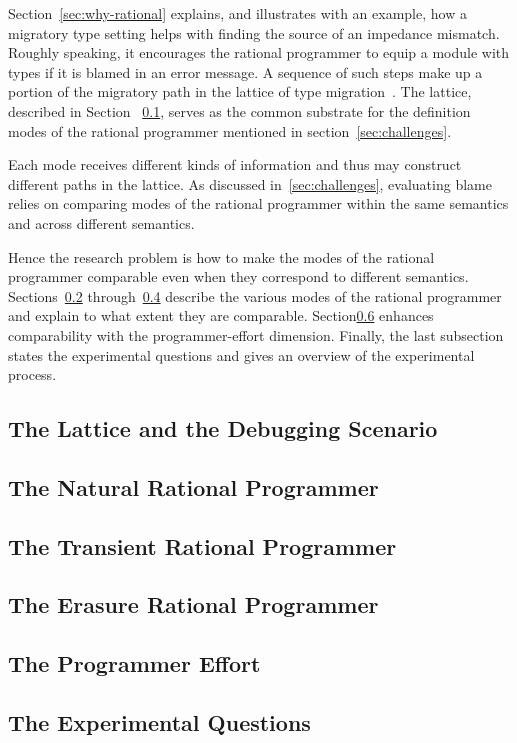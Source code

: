 
Section~\ref{sec:why-rational} explains, and illustrates with an example,
how a migratory type setting helps with finding the source of an impedance
mismatch. Roughly speaking, it encourages the rational programmer to
equip a module with types if it is blamed in an error message. A sequence
of such steps make up a portion of the migratory path in the lattice of
type migration~\cite{tfgnvf-popl-2016}. The lattice, described in Section
~\ref{sub:stuff},  serves as the common substrate for the definition modes
of the rational programmer mentioned in section~\ref{sec:challenges}. 

Each mode receives different kinds of information and thus may construct
different paths in the lattice. As discussed in~\ref{sec:challenges},
evaluating blame relies on comparing modes of the rational programmer
within the same semantics and across different semantics.  

Hence the research problem is how to make the modes of the rational programmer
comparable even when they correspond to different semantics. Sections~\ref{sub:natural}
through~\ref{sub:erasure} describe the various modes of the rational programmer and explain
to what extent they are comparable. Section\ref{sub:experiment}
enhances comparability with the programmer-effort dimension. Finally, the last
subsection states the experimental questions and gives an overview of the
experimental process. 

\def\rsub#1#2{\subsection{#2} \label{sub:#1} }

\rsub{stuff}     {The Lattice and the Debugging Scenario} 
\rsub{natural}   {The Natural Rational Programmer} 
\rsub{transient} {The Transient Rational Programmer} 
\rsub{erasure}   {The Erasure Rational Programmer} 
\rsub{effort}    {The Programmer Effort} \label{subsec:effort}
\rsub{experiment}{The Experimental Questions} 
